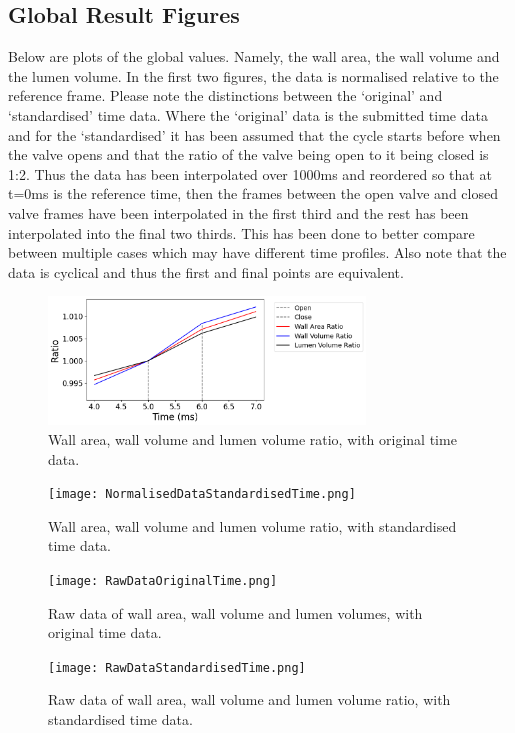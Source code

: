 \documentclass{article}
\begin{document}
\subsection*{Global Result Figures}
Below are plots of the global values. Namely, the wall area, the wall volume and the lumen volume. In the first two figures, the data is normalised relative to the reference frame. Please note the distinctions between the `original' and `standardised' time data. Where the `original' data is the submitted time data and for the `standardised' it has been assumed that the cycle starts before when the valve opens and that the ratio of the valve being open to it being closed is 1:2. Thus the data has been interpolated over 1000ms and reordered so that at t=0ms is the reference time, then the frames between the open valve and closed valve frames have been interpolated in the first third and the rest has been interpolated into the final two thirds. This has been done to better compare between multiple cases which may have different time profiles. Also note that the data is cyclical and thus the first and final points are equivalent. 
\begin{figure}[h!]
	\centering
	\includegraphics[width=0.75\textwidth]{NormalisedDataOriginalTime.png}
	\caption{Wall area, wall volume and lumen volume ratio, with original time data.}
\end{figure}


\begin{figure}[h!]
	\centering
	\texttt{[image: NormalisedDataStandardisedTime.png]}
	\caption{Wall area, wall volume and lumen volume ratio, with standardised time data.}
\end{figure}


\begin{figure}[h!]
	\centering
	\texttt{[image: RawDataOriginalTime.png]}
	\caption{Raw data of wall area, wall volume and lumen volumes, with original time data.}
\end{figure}

\begin{figure}[h!]
	\centering
	\texttt{[image: RawDataStandardisedTime.png]}
	\caption{Raw data of wall area, wall volume and lumen volume ratio, with standardised time data.}
\end{figure}
\end{document}
